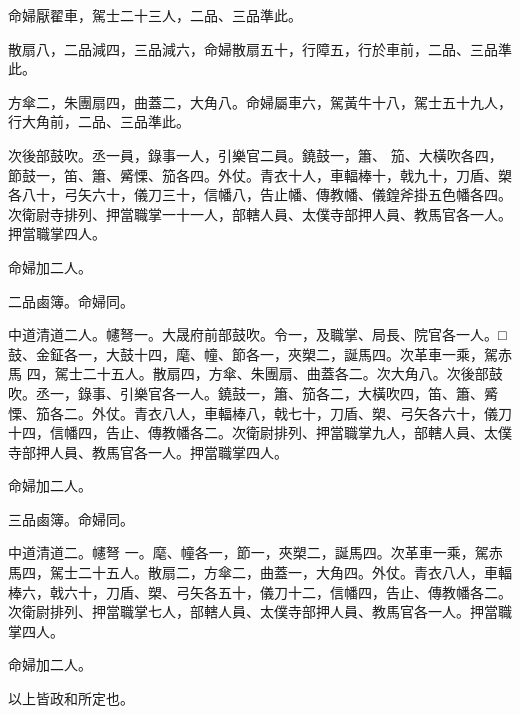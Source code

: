 \begin{pinyinscope}
 命婦厭翟車，駕士二十三人，二品、三品準此。



 散扇八，二品減四，三品減六，命婦散扇五十，行障五，行於車前，二品、三品準此。



 方傘二，朱團扇四，曲蓋二，大角八。命婦屬車六，駕黃牛十八，駕士五十九人，行大角前，二品、三品準此。



 次後部鼓吹。丞一員，錄事一人，引樂官二員。鐃鼓一，簫、
 笳、大橫吹各四，節鼓一，笛、簫、觱慄、笳各四。外仗。青衣十人，車輻棒十，戟九十，刀盾、槊各八十，弓矢六十，儀刀三十，信幡八，告止幡、傳教幡、儀鍠斧掛五色幡各四。次衛尉寺排列、押當職掌一十一人，部轄人員、太僕寺部押人員、教馬官各一人。押當職掌四人。



 命婦加二人。



 二品鹵簿。命婦同。



 中道清道二人。幰弩一。大晟府前部鼓吹。令一，及職掌、局長、院官各一人。□鼓、金鉦各一，大鼓十四，麾、幢、節各一，夾槊二，誕馬四。次革車一乘，駕赤馬
 四，駕士二十五人。散扇四，方傘、朱團扇、曲蓋各二。次大角八。次後部鼓吹。丞一，錄事、引樂官各一人。鐃鼓一，簫、笳各二，大橫吹四，笛、簫、觱慄、笳各二。外仗。青衣八人，車輻棒八，戟七十，刀盾、槊、弓矢各六十，儀刀十四，信幡四，告止、傳教幡各二。次衛尉排列、押當職掌九人，部轄人員、太僕寺部押人員、教馬官各一人。押當職掌四人。



 命婦加二人。



 三品鹵簿。命婦同。



 中道清道二。幰弩
 一。麾、幢各一，節一，夾槊二，誕馬四。次革車一乘，駕赤馬四，駕士二十五人。散扇二，方傘二，曲蓋一，大角四。外仗。青衣八人，車輻棒六，戟六十，刀盾、槊、弓矢各五十，儀刀十二，信幡四，告止、傳教幡各二。次衛尉排列、押當職掌七人，部轄人員、太僕寺部押人員、教馬官各一人。押當職掌四人。



 命婦加二人。



 以上皆政和所定也。



\end{pinyinscope}